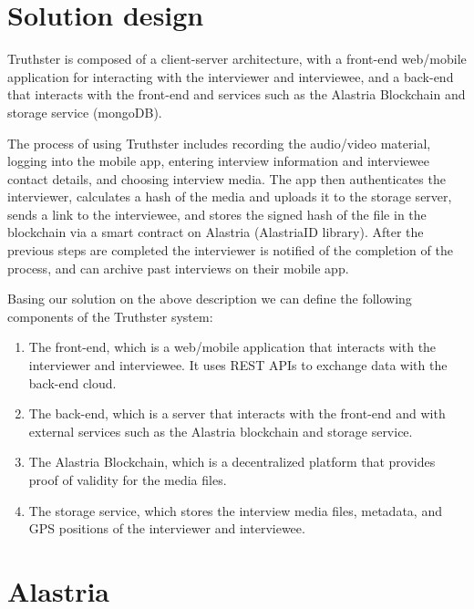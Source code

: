 \documentclass[target=mst,aauheader=]{thud}
\begin{document}
\chapter{Solution design}

Truthster is composed of a client-server architecture, with a front-end web/mobile application for interacting with the interviewer and interviewee, and a back-end that interacts with the front-end and services such as the Alastria Blockchain and storage service (mongoDB).\par
The process of using Truthster includes recording the audio/video material, logging into the mobile app, entering interview information and interviewee contact details, and choosing interview media. The app then authenticates the interviewer, calculates a hash of the media and uploads it to the storage server, sends a link to the interviewee, and stores the signed hash of the file in the blockchain via a smart contract on Alastria (AlastriaID library). After the previous steps are completed the interviewer is notified of the completion of the process, and can archive past interviews on their mobile app.\par
Basing our solution on the above description we can define the following components of the Truthster system:

\begin{enumerate}
    \item The front-end, which is a web/mobile application that interacts with the interviewer and interviewee. It uses REST APIs to exchange data with the back-end cloud.
    
    \item The back-end, which is a server that interacts with the front-end and with external services such as the Alastria blockchain and storage service.

    \item The Alastria Blockchain, which is a decentralized platform that provides proof of validity for the media files.

    \item The storage service, which stores the interview media files, metadata, and GPS positions of the interviewer and interviewee.
    
\end{enumerate}

\chapter{Alastria}
\end{document}
